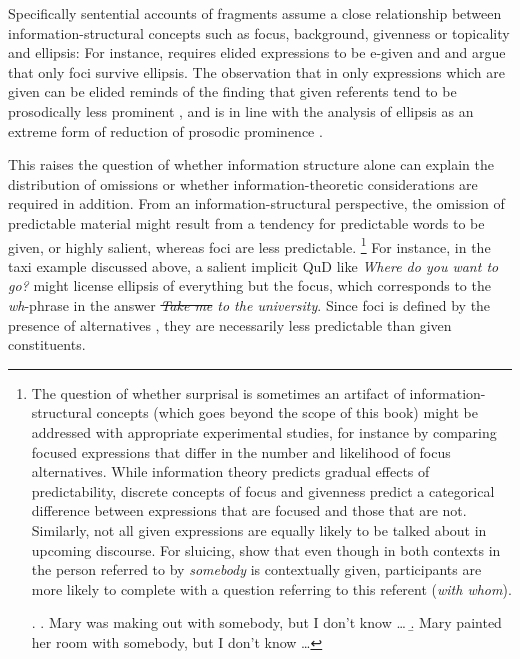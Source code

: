 Specifically sentential accounts of fragments assume a close relationship between information-structural concepts such as focus, background, givenness or topicality and ellipsis: For instance, \citet{merchant2004} requires elided expressions to be e-given and \citet{reich2007} and \citet{weir2014} argue that only foci survive ellipsis. The observation that in only expressions which are given can be elided reminds of the finding that given referents tend to be prosodically less prominent \citep{fery.ishihara2009}, and is in line with the analysis of ellipsis as an extreme form of reduction of prosodic prominence \citep{tancredi1992}.

This raises the question of whether information structure alone can explain the distribution of omissions or whether information-theoretic considerations are required in addition. From an information-structural perspective, the omission of predictable material might result from a tendency for predictable words to be given, or highly salient, whereas foci are less predictable.%
%
\footnote{The question of whether surprisal is sometimes an artifact of infor\-mation-structural concepts (which goes beyond the scope of this book) might be addressed with appropriate experimental studies, for instance by comparing focused expressions that differ in the number and likelihood of focus alternatives. While information theory predicts gradual effects of predictability, discrete concepts of focus and givenness predict a categorical difference between expressions that are focused and those that are not. Similarly, not all given expressions are equally likely to be talked about in upcoming discourse. For sluicing, \citet{lemke.etalaccepted} show that even though in both contexts in \Next the person referred to by \textit{somebody} is contextually given, participants are more likely to complete \Next[a] with a question referring to this referent (\textit{with whom}).

\ex. \a. Mary was making out with somebody, but I don't know \dots
     \b. Mary painted her room with somebody, but I don't know \dots 
     
}\afterfn%
%
For instance, in the taxi example discussed above, a salient implicit QuD like \textit{Where do you want to go?} might license ellipsis of everything but the focus, which corresponds to the \textit{wh}-phrase in the answer \textit{\sout{Take me} to the university}. Since foci is defined by the presence of alternatives \citep{rooth1992}, they are necessarily less predictable than given constituents. 

